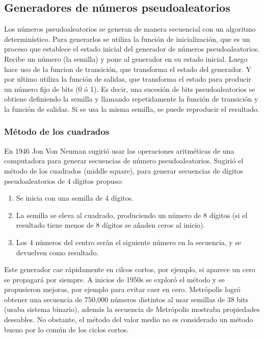 \documentclass{article}
\begin{document}
\subsection{Generadores de números pseudoaleatorios}

Los números pseudoaleatorios se generan de manera
secuencial con un algoritmo determinístico. Para generarlos se utiliza la función de inicialización, que es un proceso que establece el estado inicial del generador de números pseudoaleatorios. Recibe un número (la semilla) y pone al generador en su estado inicial.
Luego hace uso de la funcion de transición, que transforma el estado del generador. Y por ultimo utiliza la función de salidas, que transforma el estado para producir un número fijo de bits (0 ó 1).
Es decir, una sucesión de bits pseudoaleatorios se obtiene definiendo la semilla y llamando repetidamente la función de transición y la función de salidas. Si se usa la misma semilla, se puede reproducir el resultado.

\subsubsection{Método de los cuadrados}

En 1946 Jon Von Neuman sugirió usar las operaciones aritméticas de una computadora para
generar secuencias de número pseudoaleatorios.
Sugirió el método de los cuadrados (middle square), para generar secuencias de dígitos pseudoaleatorios de 4
dígitos propuso:

\begin{enumerate}
    \item Se inicia con una semilla de 4 dígitos. 
    \item La semilla se eleva al cuadrado, produciendo un número de 8 dígitos (si el resultado tiene menos de 8 dígitos se añaden ceros al inicio). 
    \item Los 4 números del centro serán el siguiente número en la secuencia, y se devuelven
como resultado.
\end{enumerate}

Este generador cae rápidamente en cilcos cortos, por ejemplo, si aparece un cero se propagará por siempre.
A inicios de 1950s se exploró el método y se propusieron mejoras, por ejemplo para evitar caer en cero. Metrópolis logró obtener una secuencia de 750,000 números distintos al usar
semillas de 38 bits (usaba sistema binario), además la secuencia de Metrópolis mostraba propiedades deseables. No obstante, el método del valor medio no es considerado un método bueno por lo común de los ciclos cortos.
\end{document}
